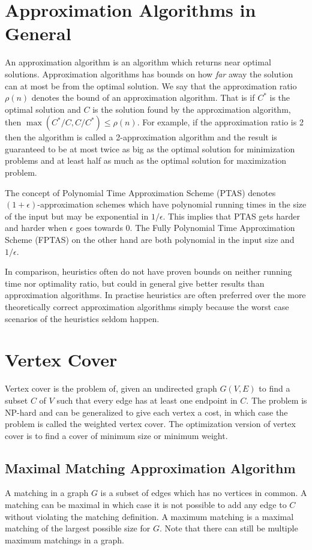 \section{Approximation Algorithms in General}
An approximation algorithm is an algorithm which returns near optimal solutions. Approximation algorithms has bounds on how \textit{far} away the solution can at most be from the optimal solution. We say that the approximation ratio $\rho(n)$ denotes the bound of an approximation algorithm. That is if $C^*$ is the optimal solution and $C$ is the solution found by the approximation algorithm, then $\max(C^*/C, C/C^*) \le \rho(n)$. For example, if the approximation ratio is 2 then the algorithm is called a 2-approximation algorithm and the result is guaranteed to be at most twice as big as the optimal solution for minimization problems and at least half as much as the optimal solution for maximization problem.

The concept of Polynomial Time Approximation Scheme (PTAS) denotes $(1+\epsilon)$-approximation schemes which have polynomial running times in the size of the input but may be exponential in $1/\epsilon$. This implies that PTAS gets harder and harder when $\epsilon$ goes towards 0. The Fully Polynomial Time Approximation Scheme (FPTAS) on the other hand are both polynomial in the input size and $1/\epsilon$. 

In comparison, heuristics often do not have proven bounds on neither running time nor optimality ratio, but could in general give better results than approximation algorithms. In practise heuristics are often preferred over the more theoretically correct approximation algorithms simply because the worst case scenarios of the heuristics seldom happen.

\section{Vertex Cover}
Vertex cover is the problem of, given an undirected graph $G(V,E)$ to find a subset $C$ of $V$ such that every edge has at least one endpoint in $C$. The problem is NP-hard and can be generalized to give each vertex a cost, in which case the problem is called the weighted vertex cover. The optimization version of vertex cover is to find a cover of minimum size or minimum weight.

\subsection{Maximal Matching Approximation Algorithm}
A matching in a graph $G$ is a subset of edges which has no vertices in common. A matching can be maximal in which case it is not possible to add any edge to $C$ without violating the matching definition. A maximum matching is a maximal matching of the largest possible size for $G$. Note that there can still be multiple maximum matchings in a graph. 


